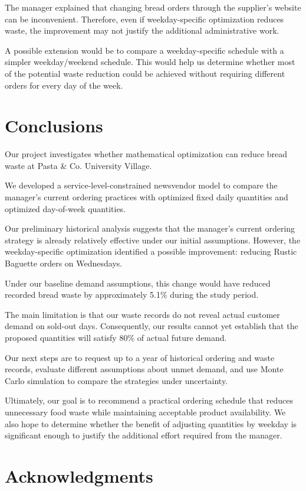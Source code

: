 \documentclass[11pt]{article}
\begin{document}
The manager explained that changing bread orders through the supplier's website can be inconvenient. Therefore, even if weekday-specific optimization reduces waste, the improvement may not justify the additional administrative work.

A possible extension would be to compare a weekday-specific schedule with a simpler weekday/weekend schedule. This would help us determine whether most of the potential waste reduction could be achieved without requiring different orders for every day of the week.

\section{Conclusions}

Our project investigates whether mathematical optimization can reduce bread waste at Pasta \& Co. University Village.

We developed a service-level-constrained newsvendor model to compare the manager's current ordering practices with optimized fixed daily quantities and optimized day-of-week quantities.

Our preliminary historical analysis suggests that the manager's current ordering strategy is already relatively effective under our initial assumptions. However, the weekday-specific optimization identified a possible improvement: reducing Rustic Baguette orders on Wednesdays.

Under our baseline demand assumptions, this change would have reduced recorded bread waste by approximately 5.1\% during the study period.

The main limitation is that our waste records do not reveal actual customer demand on sold-out days. Consequently, our results cannot yet establish that the proposed quantities will satisfy 80\% of actual future demand.

Our next steps are to request up to a year of historical ordering and waste records, evaluate different assumptions about unmet demand, and use Monte Carlo simulation to compare the strategies under uncertainty.

Ultimately, our goal is to recommend a practical ordering schedule that reduces unnecessary food waste while maintaining acceptable product availability. We also hope to determine whether the benefit of adjusting quantities by weekday is significant enough to justify the additional effort required from the manager.

\section*{Acknowledgments}
\end{document}
